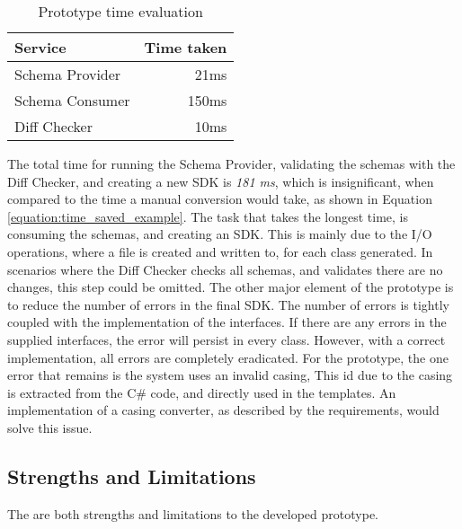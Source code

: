 \begin{table}[h]
    \centering
    \begin{tabular}{lr}
    \toprule
         Service & Time taken \\
    \midrule
         Schema Provider & 21ms \\
         Schema Consumer & 150ms \\
         Diff Checker & 10ms \\
    \bottomrule
    \end{tabular}
    \caption{Prototype time evaluation}
    \label{tab:prototype_time_eval}
\end{table}
\noindent
The total time for running the Schema Provider, validating the schemas with the Diff Checker, and creating a new SDK is \textit{181 ms}, which is insignificant, when compared to the time a manual conversion would take, as shown in Equation \ref{equation:time_saved_example}.
The task that takes the longest time, is consuming the schemas, and creating an SDK. This is mainly due to the I/O operations, where a file is created and written to, for each class generated.
In scenarios where the Diff Checker checks all schemas, and validates there are no changes, this step could be omitted.
\newline\newline
The other major element of the prototype is to reduce the number of errors in the final SDK.
The number of errors is tightly coupled with the implementation of the interfaces. If there are any errors in the supplied interfaces, the error will persist in every class. However, with a correct implementation, all errors are completely eradicated.
For the prototype, the one error that remains is the system uses an invalid casing,
This id due to the casing is extracted from the C\# code, and directly used in the templates.
An implementation of a casing converter, as described by the requirements, would solve this issue.

\subsection{Strengths and Limitations}
The are both strengths and limitations to the developed prototype.
